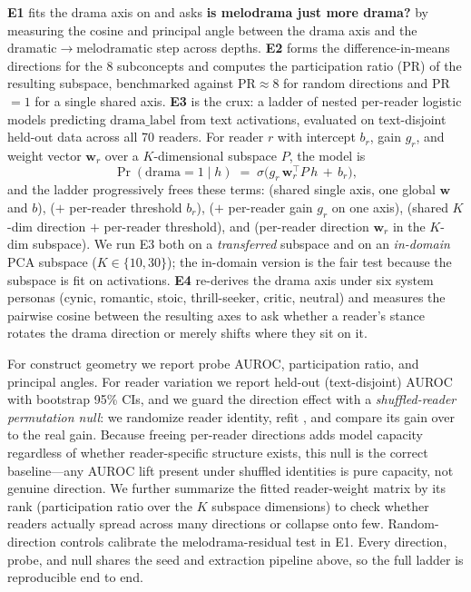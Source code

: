  \textbf{E1} fits the drama axis on \dramacorpus and asks {\bf is melodrama just more drama?} by measuring the cosine and principal angle between the drama axis and the dramatic$\rightarrow$melodramatic step across depths. \textbf{E2} forms the difference-in-means directions for the 8 subconcepts and computes the participation ratio (PR) of the resulting subspace, benchmarked against PR${\approx}8$ for random directions and PR${=}1$ for a single shared axis. \textbf{E3} is the crux: a ladder of nested per-reader logistic models predicting $\mathrm{drama\_label}$ from text activations, evaluated on text-disjoint held-out data across all 70 readers. For reader $r$ with intercept $b_r$, gain $g_r$, and weight vector $\mathbf{w}_r$ over a $K$-dimensional subspace $P$, the model is
\[
\Pr(\mathrm{drama}=1 \mid h) \;=\; \sigma\!\big(g_r\,\mathbf{w}_r^{\top} P\,h \,+\, b_r\big),
\]
and the ladder progressively frees these terms: \Mzero (shared single axis, one global $\mathbf{w}$ and $b$), \Mone ($+$ per-reader threshold $b_r$), \Mtwo ($+$ per-reader gain $g_r$ on one axis), \MtwoK (shared $K$-dim direction $+$ per-reader threshold), and \Mthree (per-reader direction $\mathbf{w}_r$ in the $K$-dim subspace). We run E3 both on a \emph{transferred} \dramacorpus subspace and on an \emph{in-domain} PCA subspace ($K \in \{10, 30\}$); the in-domain version is the fair test because the subspace is fit on \goemotions activations. \textbf{E4} re-derives the drama axis under six system personas (cynic, romantic, stoic, thrill-seeker, critic, neutral) and measures the pairwise cosine between the resulting axes to ask whether a reader's stance rotates the drama direction or merely shifts where they sit on it.

 For construct geometry we report probe AUROC, participation ratio, and principal angles. For reader variation we report held-out (text-disjoint) AUROC with bootstrap 95\% CIs, and we guard the \Mthree direction effect with a \emph{shuffled-reader permutation null}: we randomize reader identity, refit \Mthree, and compare its gain over \MtwoK to the real gain. Because freeing per-reader directions adds model capacity regardless of whether reader-specific structure exists, this null is the correct baseline---any AUROC lift present under shuffled identities is pure capacity, not genuine direction. We further summarize the fitted reader-weight matrix by its rank (participation ratio over the $K$ subspace dimensions) to check whether readers actually spread across many directions or collapse onto few. Random-direction controls calibrate the melodrama-residual test in E1. Every direction, probe, and null shares the seed and extraction pipeline above, so the full ladder is reproducible end to end.
